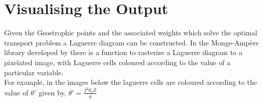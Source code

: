 \section{Visualising the Output \label{plotting}}
Given the Geostrophic points and the associated weights which solve the optimal transport problem a Laguerre diagram can be constructed. In the Monge-Amp\`{e}re library developed by \cite{Merigot2017} there is a function to rasterize a Laguerre diagram to a pixelated image, with Laguerre cells coloured according to the value of a particular variable.\\
\linebreak
For example, in the images below the laguerre cells are coloured according to the value of $\theta '$ given by, $\theta ' = \frac{f^2\theta_0 Z}{g}$
